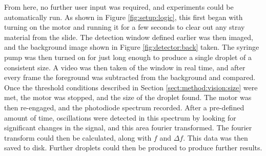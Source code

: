 \documentclass{physics_article_B}
\begin{document}
        From here, no further user input was required, and experiments could be automatically run. As shown in Figure \ref{fig:setup:logic}, this first began with turning on the motor and running it for a few seconds to clear out any stray material from the slide. The detection window defined earlier was then imaged, and the background image shown in Figure \ref{fig:detector:back} taken. The syringe pump was then turned on for just long enough to produce a single droplet of a consistent size. A video was then taken of the window in real time, and after every frame the foreground was subtracted from the background and compared. Once the threshold conditions described in Section \ref{sect:method:vision:size} were met, the motor was stopped, and the size of the droplet found. The motor was then re-engaged, and the photodiode spectrum recorded. After a pre-defined amount of time, oscillations were detected in this spectrum by looking for significant changes in the signal, and this area fourier transformed. The fourier transform could then be calculated, along with $f$ and $\Delta f$. This data was then saved to disk. Further droplets could then be produced to produce further results.
\end{document}

